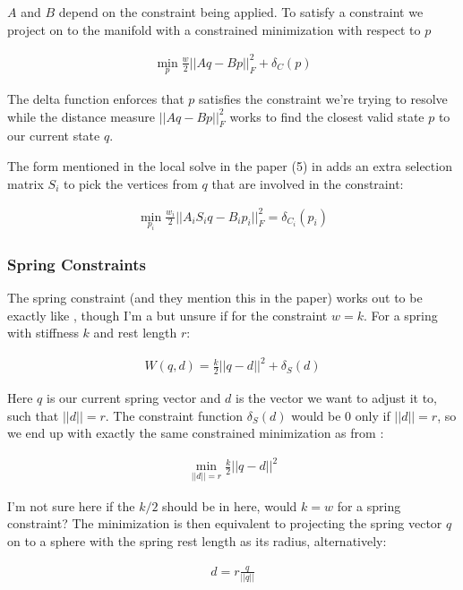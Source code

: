 \documentclass[11pt]{article}
\begin{document}
$A$ and $B$ depend on the constraint being applied. To satisfy a constraint we project on to the manifold
with a constrained minimization with respect to $p$

\begin{align}
	\min_p \frac{w}{2} || A q - B p ||^2_F + \delta_C(p)
\end{align}

The delta function enforces that $p$ satisfies the constraint we're trying to resolve while the distance measure
$|| A q - B p ||^2_F$ works to find the closest valid state $p$ to our current state $q$.

The form mentioned in the local solve in the paper (5) in \cite{projective_dynamics} adds an extra
selection matrix $S_i$ to pick the vertices from $q$ that are involved in the constraint:

\begin{align}
	\min_{p_i} \frac{w_i}{2} || A_i S_i q - B_i p_i ||^2_F = \delta_{C_i}(p_i)
\end{align}

\subsubsection{Spring Constraints}

The spring constraint (and they mention this in the paper) works out to be exactly like \cite{fast_mass_spring},
though I'm a but unsure if for the constraint $w = k$. For a spring with stiffness $k$ and rest length $r$:

\begin{align}
	W(q, d) = \frac{k}{2} || q - d ||^2 + \delta_S(d)
\end{align}

Here $q$ is our current spring vector and $d$ is the vector we want to adjust it to, such that $||d|| = r$.
The constraint function $\delta_S(d)$ would be 0 only if $||d|| = r$, so we end up with exactly the same
constrained minimization as from \cite{fast_mass_spring}:

\begin{align}
	\min_{||d|| = r} \frac{k}{2} ||q - d||^2
\end{align}

I'm not sure here if the $k/2$ should be in here, would $k = w$ for a spring constraint? The minimization is
then equivalent to projecting the spring vector $q$ on to a sphere with the spring rest length as its radius,
alternatively:

\begin{align}
	d = r \frac{q}{||q||}
\end{align}
\end{document}
